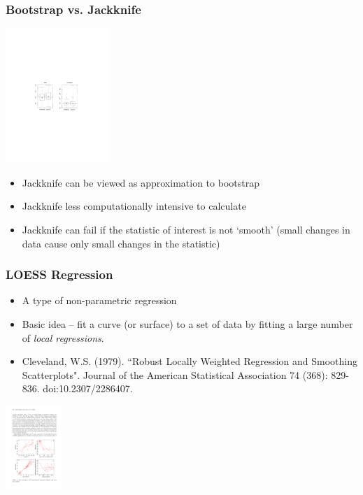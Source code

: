 \documentclass{beamer}
\begin{document}
\begin{frame}
  \frametitle{Bootstrap vs. Jackknife}

\begin{center}
\includegraphics[height=2in]{jack-vs-boot}
\end{center}

\begin{itemize}
    \item Jackknife can be viewed as approximation to bootstrap
    \item Jackknife less computationally intensive to calculate
    \item Jackknife can fail if the statistic of interest is not `smooth' (small changes in data cause only small changes in the statistic)
\end{itemize}

\end{frame}

\begin{frame}
  \frametitle{LOESS Regression}

\begin{itemize}
    \item A type of non-parametric regression
    \item Basic idea -- fit a curve (or surface) to a set of data by fitting a large number of \emph{local regressions}.
    \item Cleveland, W.S. (1979). ``Robust Locally Weighted Regression and Smoothing Scatterplots". Journal of the American Statistical Association 74 (368): 829-836. doi:10.2307/2286407.
\end{itemize}

\begin{center}
\includegraphics[height=1.25in]{loess-example.pdf}
\end{center}


\end{frame}
\end{document}
